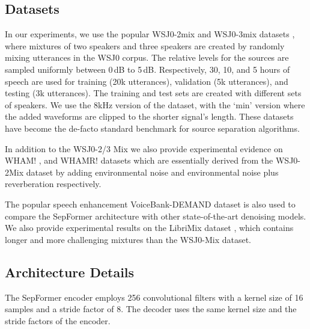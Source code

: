 \documentclass[lettersize,journal]{IEEEtran}
\begin{document}
\subsection{Datasets} 
In our experiments, we use the popular WSJ0-2mix and WSJ0-3mix datasets \cite{hershey2015deep}, where mixtures of two speakers and three speakers are created by randomly mixing utterances in the WSJ0 corpus. The relative levels for the sources are sampled uniformly between 0\,dB to 5\,dB. Respectively, 30, 10, and 5 hours of speech are used for training (20k utterances), validation (5k utterances), and testing (3k utterances). The training and test sets are created with different sets of speakers. We use the 8kHz version of the dataset, with the `min' version where the added waveforms are clipped to the shorter signal's length. These datasets have become the de-facto standard benchmark for source separation algorithms.

In addition to the WSJ0-2/3 Mix we also provide experimental evidence on WHAM! \cite{wichern2019wham}, and WHAMR! datasets \cite{maciejewski2020whamr} which are essentially derived from the WSJ0-2Mix dataset by adding environmental noise and environmental noise plus reverberation respectively. 

The popular speech enhancement VoiceBank-DEMAND dataset \cite{ValentiniBotinhao2016InvestigatingRS} is also used to compare the SepFormer architecture with other state-of-the-art denoising models.
We also provide experimental results on the LibriMix dataset \cite{cosentino2020librimix}, which contains longer and more challenging mixtures than the WSJ0-Mix dataset. 



\subsection{Architecture Details}

The SepFormer encoder employs 256 convolutional filters with a kernel size of 16 samples and a stride factor of 8. The decoder uses the same kernel size and the stride factors of the encoder. 
\end{document}
